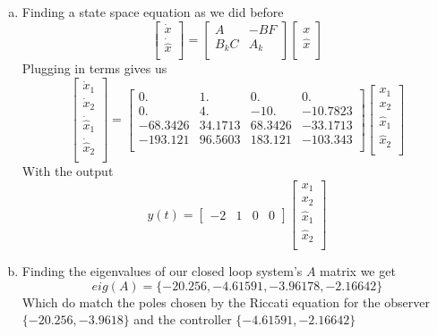 \documentclass{article}
\begin{document}
\begin{enumerate}[(a)]
\begin{enumerate}[(a)]
\item Finding a state space equation as we did before
$$
\begin{bmatrix}
\dot{x} \\
\dot{\hat{x}} \\
\end{bmatrix}
=
\begin{bmatrix}
A & -BF \\
B_kC & A_k \\
\end{bmatrix}
\begin{bmatrix}
x\\
\hat{x} \\
\end{bmatrix}
$$
Plugging in terms gives us
$$
\begin{bmatrix}
\dot{x}_1 \\
\dot{x}_2 \\
\dot{\hat{x}}_1 \\
\dot{\hat{x}}_2 \\
\end{bmatrix}
=
\begin{bmatrix}
0. & 1. & 0. & 0. \\
0. & 4. & -10. & -10.7823 \\
-68.3426 & 34.1713 & 68.3426 & -33.1713 \\
-193.121 & 96.5603 & 183.121 & -103.343 \\
\end{bmatrix}
\begin{bmatrix}
x_1 \\
x_2 \\
\hat{x}_1 \\
\hat{x}_2 \\
\end{bmatrix}
$$
With the output
$$
y(t) =
\begin{bmatrix}
-2 & 1 & 0 & 0
\end{bmatrix}
\begin{bmatrix}
x_1 \\
x_2 \\
\hat{x}_1 \\
\hat{x}_2 \\
\end{bmatrix}
$$

\item Finding the eigenvalues of our closed loop system's $A$ matrix we get
$$ eig(A) = \{-20.256, -4.61591, -3.96178, -2.16642\} $$
Which do match the poles chosen by the Riccati equation for the observer $\{-20.256, -3.9618\}$ and the controller $\{-4.61591, -2.16642\}$


\end{enumerate}
\end{enumerate}
\end{document}
